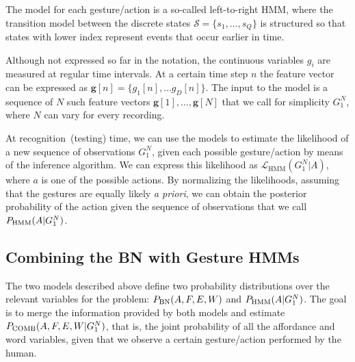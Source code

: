 The model for each gesture/action is a so-called left-to-right \ac{HMM}, where the transition model between the discrete states $\mathcal{S} = \{s_1, \dots, s_Q\}$ is structured so that states with lower index represent events that occur earlier in time.

Although not expressed so far in the notation, the continuous variables $g_i$ are measured at regular time intervals.
At a certain time step $n$ the feature vector can be expressed as $\mathbf{g}[n] = \{g_1[n], \dots g_D[n]\}$.
The input to the model is a sequence of $N$ such feature vectors $\mathbf{g}[1], \dots, \mathbf{g}[N]$ that we call for simplicity $G_1^N$, where $N$ can vary for every recording.

At recognition~(testing) time, we can use the models to estimate the likelihood of a new sequence of observations $G_1^N$, given each possible gesture/action by means of the \FB{} inference algorithm.
We can express this likelihood as $\mathcal{L}_\text{HMM}(G_1^N|A)$, where $a$ is one of the possible actions.
By normalizing the likelihoods, assuming that the gestures are equally likely \emph{a priori}, we can obtain the posterior probability of the action given the sequence of observations that we call $P_{\text{HMM}}(A|G_1^N)$.


\newcommand{\pcomb}{\ensuremath P_\text{COMB}}
\newcommand{\xinf}{\ensuremath X_\text{INF}}
\newcommand{\xobs}{\ensuremath X_\text{OBS}}
\newcommand{\xlat}{\ensuremath X_\text{LAT}}

\subsection{Combining the \acs{BN} with Gesture \acsp{HMM}}
\label{sec:combination}
The two models described above define two probability distributions over the relevant variables for the problem:
$P_{\text{BN}}(A, F, E, W)$ and $P_{\text{HMM}}(A|G_1^N)$.
The goal is to merge the information provided by both models and estimate $\pcomb(A, F, E, W|G_1^N)$, that is, the joint probability of all the affordance and word variables, given that we observe a certain gesture/action performed by the human.

